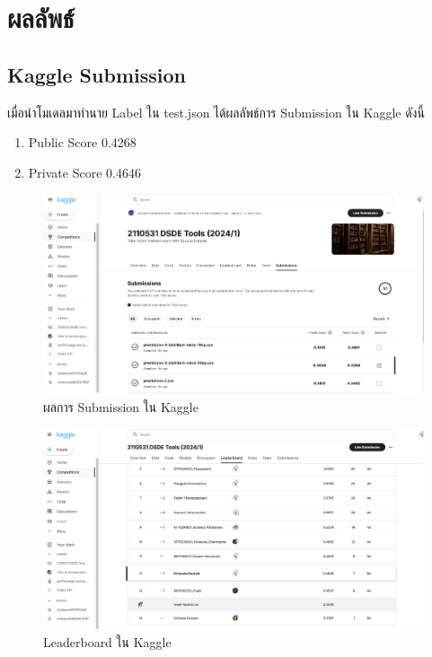 \chapter{ผลลัพธ์}
\section{Kaggle Submission}
เมื่อนำโมเดลมาทำนาย Label ใน test.json
ได้ผลลัพธ์การ Submission ใน Kaggle ดังนี้
\begin{enumerate}
    \item Public Score 0.4268
    \item Private Score 0.4646
\end{enumerate}



\begin{figure}[ht]
    \centering
    \includegraphics[width=\imgwidth]{images/kaggle_submission.jpg} 
    \caption{ผลการ Submission ใน Kaggle}
    \label{fig:kaggle_submission}
\end{figure}

\begin{figure}[ht]
    \centering
    \includegraphics[width=\imgwidth]{images/kaggle_leaderboard.jpg} 
    \caption{Leaderboard ใน Kaggle}
    \label{fig:kaggle_leaderboard}
\end{figure}
